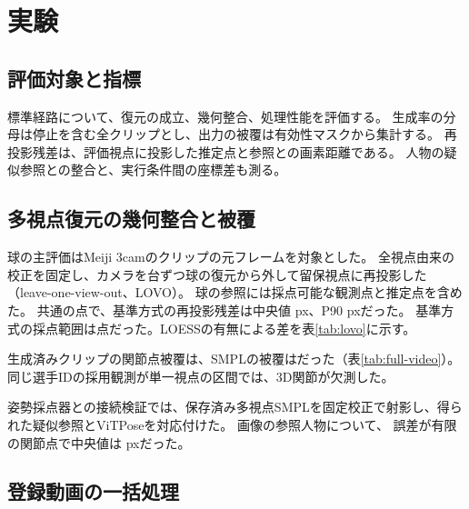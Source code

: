 \section{実験}
\label{sec:experiments}

\subsection{評価対象と指標}

標準経路について、復元の成立、幾何整合、処理性能を評価する。
生成率の分母は停止を含む全クリップとし、出力の被覆は有効性マスクから集計する。
再投影残差は、評価視点に投影した推定点と参照との画素距離である。
人物の疑似参照との整合と、実行条件間の座標差も測る。

\subsection{多視点復元の幾何整合と被覆}

球の主評価はMeiji 3camのクリップの元フレーム\ev{lovo}{[505,1010)}を対象とした。
全視点由来の校正を固定し、カメラを台ずつ球の復元から外して留保視点に再投影した（leave-one-view-out、LOVO）。
球の参照には採点可能な観測点と推定点を含めた。
共通の点で、基準方式の再投影残差は中央値 px、P90  pxだった。
基準方式の採点範囲は点だった。LOESSの有無による差を表\ref{tab:lovo}に示す。

\begin{table}[tbp]
\centering
\caption{球のLOVO再投影誤差。元画像pxで集計。
共通集合には比較方式すべてと幾何参照が同じ視点・時刻で採点可能な点を含む。}
\label{tab:lovo}
\small

\end{table}

生成済みクリップの関節点被覆は、SMPLの被覆はだった（表\ref{tab:full-video}）。
同じ選手IDの採用観測が単一視点の区間では、3D関節が欠測した。

姿勢採点器との接続検証では、保存済み多視点SMPLを固定校正で射影し、得られた疑似参照とViTPoseを対応付けた。
画像の参照人物について、
誤差が有限の関節点で中央値は pxだった。

\subsection{登録動画の一括処理}

